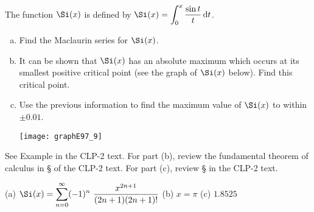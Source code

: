 \begin{Mquestion}[1997A]
 The function $\Si(x)$ is defined by $\Si(x)=\displaystyle\int_0^x\frac{\sin t}{t}\,\dee{t}$.

\begin{enumerate}[(a)]
\item
Find the Maclaurin series for $\Si(x)$.
\item
 It can be shown that $\Si(x)$ has an absolute maximum which occurs at its smallest
positive critical point (see the graph of $\Si(x)$ below). Find this critical
point.
\item
 Use the previous information to find the maximum value
of $\Si(x)$ to within $\pm 0.01$.

\begin{center}
       \texttt{[image: graphE97\_9]}
\end{center}
\end{enumerate}
\end{Mquestion}

\begin{hint}
See Example  in the
CLP-2 text.
For part (b), review  the fundamental theorem of calculus in \S {}
of the
CLP-2 text.
For part (c), review  \S {} in the
CLP-2 text.

\end{hint}

\begin{answer}
(a)
$\displaystyle\Si(x)
=\sum\limits_{n=0}^\infty (-1)^n\ \frac{x^{2n+1}}{(2n+1)(2n+1)!}$
\qquad (b)
$x=\pi$
\qquad (c)
$1.8525$
\end{answer}

